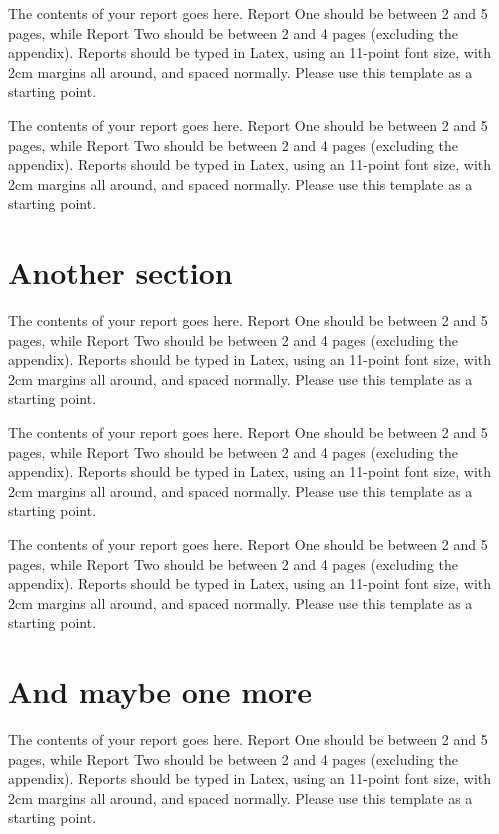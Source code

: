 \documentclass[a4paper,11pt]{article}
\begin{document}
The contents of your report goes here.  Report One should be between 2
and 5 pages, while Report Two should be between 2 and 4 pages
(excluding the appendix).  Reports should be typed in Latex, using an
11-point font size, with 2cm margins all around, and spaced normally.
Please use this template as a starting point.

The contents of your report goes here.  Report One should be between 2
and 5 pages, while Report Two should be between 2 and 4 pages
(excluding the appendix).  Reports should be typed in Latex, using an
11-point font size, with 2cm margins all around, and spaced normally.
Please use this template as a starting point.


\section{Another section}

The contents of your report goes here.  Report One should be between 2
and 5 pages, while Report Two should be between 2 and 4 pages
(excluding the appendix).  Reports should be typed in Latex, using an
11-point font size, with 2cm margins all around, and spaced normally.
Please use this template as a starting point.

The contents of your report goes here.  Report One should be between 2
and 5 pages, while Report Two should be between 2 and 4 pages
(excluding the appendix).  Reports should be typed in Latex, using an
11-point font size, with 2cm margins all around, and spaced normally.
Please use this template as a starting point.

The contents of your report goes here.  Report One should be between 2
and 5 pages, while Report Two should be between 2 and 4 pages
(excluding the appendix).  Reports should be typed in Latex, using an
11-point font size, with 2cm margins all around, and spaced normally.
Please use this template as a starting point.


\section{And maybe one more}

The contents of your report goes here.  Report One should be between 2
and 5 pages, while Report Two should be between 2 and 4 pages
(excluding the appendix).  Reports should be typed in Latex, using an
11-point font size, with 2cm margins all around, and spaced normally.
Please use this template as a starting point.
\end{document}
